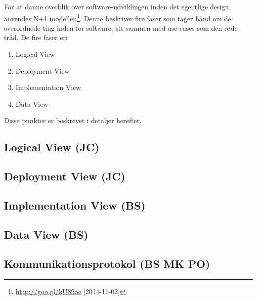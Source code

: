 For at danne overblik over software-udviklingen inden det egentlige design, anvendes N+1 modellen\footnote{\url{http://goo.gl/kU89oe} [2014-11-02]}.
Denne beskriver fire faser som tager hånd om de overordnede ting inden for software, alt sammen med use-cases som den røde tråd.
De fire faser er:

\begin{enumerate}
	\item Logical View
	\item Deployment View
	\item Implementation View
	\item Data View
\end{enumerate}

Disse punkter er beskrevet i detaljer herefter.

\subsection{Logical View (JC)}


\clearpage
\subsection{Deployment View (JC)}



\subsection{Implementation View (BS)}


\subsection{Data View (BS)}


%

\subsection{Kommunikationsprotokol (BS MK PO)}\label{header:kommunikationsprotokol}
